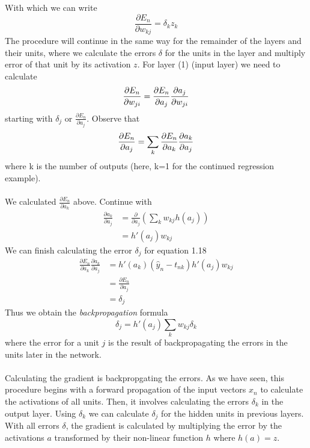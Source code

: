 With which we can write
\begin{equation}
    \frac{\partial{E_n}}{\partial w_{kj}} = \delta_{k}z_{k}
\end{equation}
The procedure will continue in the same way for the remainder of the layers and their 
units, where we calculate the errors $\delta$ for the units in the layer and multiply 
error of that unit by its activation $z$. For layer (1) (input layer) we need to calculate
\begin{equation}
    \frac{\partial E_n}{\partial w_{ji}} = \frac{\partial E_n}{\partial a_j} \\
    \frac{\partial a_j}{\partial w_{ji}}
\end{equation}
starting with $\delta_{j}$ or $\frac{\partial E_{n}}{\partial a_{j}}$. 
Observe that 
\begin{equation}
    \frac{\partial E_n}{\partial a_j} = \sum_{k} \\
    \frac{\partial E_n}{\partial a_{k}} \frac{\partial a_{k}}{\partial a_{j}}
\end{equation} where k is the number of outputs (here, k=1 for the continued
regression example).
\\\\
We calculated $\frac{\partial E_{n}}{\partial a_{k}}$ above. Continue with 
\begin{equation}
    \begin{split}
    \frac{\partial a_k}{\partial a_{j}} &= \frac{\partial}{\partial a_{j}} \left( \sum_{k} w_{kj}h(a_{j}) \right) \\
    &= h'(a_{j})w_{kj}
    \end{split}
\end{equation} 
We can finish calculating the error $\delta_{j}$ for equation 1.18
\begin{equation}
    \begin{split}
    \frac{\partial E_n}{\partial a_k} \frac{\partial a_k}{\partial a_{j}} &= h'(a_k)(\hat{y}_n - t_{nk}) h'(a_{j}) w_{kj} \\
    &= \frac{\partial E_n}{\partial a_j} \\
    & = \delta_{j}
    \end{split}
\end{equation} 
Thus we obtain the \textit{backpropagation} formula
\begin{equation}
    \delta_{j} = h'(a_{j}) \sum_{k} w_{kj} \delta_{k}
\end{equation} where the error for a unit $j$ is the result of backpropagating the errors 
in the units later in the network.
\\\\
Calculating the gradient is backpropgating the errors. As we have seen, this
procedure begins with a forward propagation of the input vectors $x_{n}$ to
calculate the activations of all units. Then, it involves calculating the 
errors $\delta_{k}$ in the output layer. Using $\delta_{k}$ we can calculate
$\delta_{j}$ for the hidden units in previous layers. With all errors 
$\delta$, the gradient is calculated by multiplying the error by the 
activations $a$ transformed by their non-linear function $h$ where $h(a) = z$.
